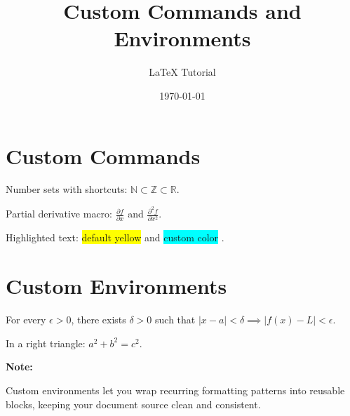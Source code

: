 \documentclass[12pt]{article}
\title{Custom Commands and Environments}
\author{LaTeX Tutorial}
\date{\today}
\newcommand{\R}{\mathbb{R}}
\newcommand{\N}{\mathbb{N}}
\newcommand{\Z}{\mathbb{Z}}
\newcommand{\pd}[2]{\frac{\partial #1}{\partial #2}}
\newcommand{\highlight}[2][yellow]{%
    \colorbox{#1}{#2}%
}
\newenvironment{mythm}[1][Theorem]{%
    \begin{tcolorbox}[title=#1, colback=blue!5, colframe=blue!50!black]
}{%
    \end{tcolorbox}
}
\newenvironment{mynote}{%
    \par\noindent\textbf{Note:}\itshape\space
}{%
    \par
}
\begin{document}
\maketitle

\section{Custom Commands}

Number sets with shortcuts: $\N \subset \Z \subset \R$.

\medskip

Partial derivative macro: $\pd{f}{x}$ and $\pd{^2 f}{x^2}$.

\medskip

Highlighted text: \highlight{default yellow} and \highlight[cyan]{custom color}.

\section{Custom Environments}

\begin{mythm}
For every $\epsilon > 0$, there exists $\delta > 0$ such that
$|x - a| < \delta \implies |f(x) - L| < \epsilon$.
\end{mythm}

\begin{mythm}[Pythagorean Theorem]
In a right triangle: $a^2 + b^2 = c^2$.
\end{mythm}

\begin{mynote}
Custom environments let you wrap recurring formatting patterns
into reusable blocks, keeping your document source clean and consistent.
\end{mynote}
\end{document}
